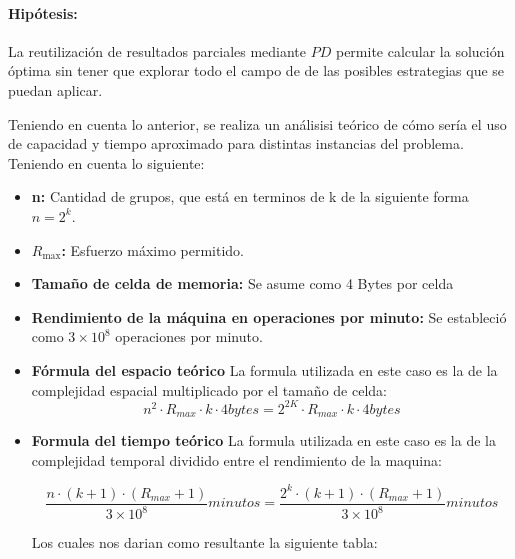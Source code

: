 \documentclass[11pt,letter]{article}
\begin{document}
\begin{itemize}
    \paragraph{Hipótesis:}

    La reutilización de resultados parciales mediante $PD$ permite calcular la solución óptima sin tener que explorar todo el campo de de las posibles estrategias que se puedan aplicar.

    Teniendo en cuenta lo anterior, se realiza un análisisi teórico de cómo sería el uso de capacidad y tiempo aproximado para distintas instancias del problema. Teniendo en cuenta lo siguiente:

\begin{itemize}

  \item \textbf{n:}
  Cantidad de grupos, que está en terminos de k de la siguiente forma $n=2^k$.

  \item \textbf{$R_{\text{max}}$:}
  Esfuerzo máximo permitido.

  \item \textbf{Tamaño de celda de memoria:}
  Se asume como 4 Bytes por celda

  \item \textbf{Rendimiento de la máquina en operaciones por minuto:}
  Se estableció como $3 \times 10^8$ operaciones por minuto.

    \item \textbf{Fórmula del espacio teórico}
La formula utilizada en este caso es la de la complejidad espacial multiplicado por el tamaño de celda:
    \[
        n^2 \cdot R_{max} \cdot k \cdot 4 bytes = 2^{2K} \cdot R_{max} \cdot k \cdot 4 bytes
    \]

    \item \textbf{Formula del tiempo teórico}
La formula utilizada en este caso es la de la complejidad temporal dividido entre el rendimiento de la maquina:

\[
\frac{n \cdot (k+1) \cdot (R_{max}+1)}{3 \times 10^{8}} minutos = \frac{2^k \cdot (k+1) \cdot (R_{max}+1)}{3 \times 10^{8}} minutos
\]


Los cuales nos darian como resultante la siguiente tabla:
\end{itemize}



\end{itemize}
\end{document}
